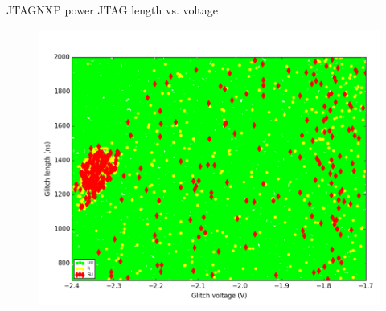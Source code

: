 \documentclass[table]{beamer}
\begin{document}
\begin{frame}{JTAG}{NXP power JTAG length vs. voltage}
    \vspace{-.3cm}
    \begin{figure}[H]
      \centering
      \includegraphics[width=.8\textwidth]{../../plots/newplots/nxp-jtag-voltage-length.png}
    \end{figure}
\end{frame}
\end{document}
